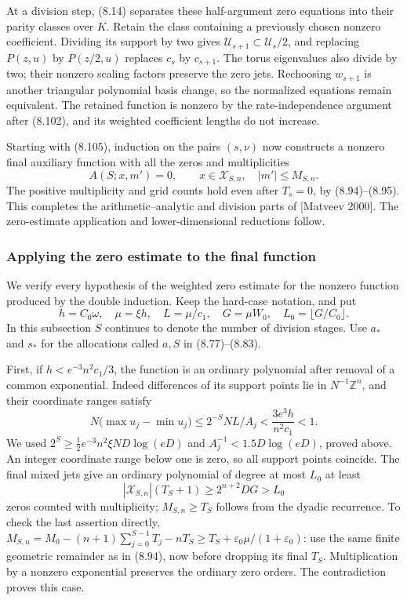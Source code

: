 \documentclass[
  11pt,
  a4paper,
]{article}
\begin{document}
At a division step, (8.14) separates these half-argument zero equations
into their parity classes over \(K\). Retain the class containing a
previously chosen nonzero coefficient. Dividing its support by two gives
\(\mathcal U_{s+1}\subset\mathcal U_s/2\), and replacing \(P(z,u)\) by
\(P(z/2,u)\) replaces \(c_s\) by \(c_{s+1}\). The torus eigenvalues also
divide by two; their nonzero scaling factors preserve the zero jets.
Rechoosing \(w_{s+1}\) is another triangular polynomial basis change, so
the normalized equations remain equivalent. The retained function is
nonzero by the rate-independence argument after (8.102), and its
weighted coefficient lengths do not increase.

Starting with (8.105), induction on the pairs \((s,\nu)\) now constructs
a nonzero final auxiliary function with all the zeros and multiplicities
\[
A(S;x,m')=0,\qquad
x\in\mathcal X_{S,n},\quad |m'|\le M_{S,n}.
\] The positive multiplicity and grid counts hold even after \(T_s=0\),
by (8.94)--(8.95). This completes the arithmetic--analytic and division
parts of {[}Matveev 2000{]}. The zero-estimate application and
lower-dimensional reductions follow.

\subsubsection{Applying the zero estimate to the final
function}\label{applying-the-zero-estimate-to-the-final-function}

We verify every hypothesis of the weighted zero estimate for the nonzero
function produced by the double induction. Keep the hard-case notation,
and put \[
h=C_0\omega,\quad \mu=\xi h,\quad L=\mu/c_1,\quad
G=\mu W_0,\quad L_0=\lfloor G/C_0\rfloor.
\] In this subsection \(S\) continues to denote the number of division
stages. Use \(a_*\) and \(s_*\) for the allocations called \(a,S\) in
(8.77)--(8.83).

First, if \(h<e^{-3}n^2c_1/3\), the function is an ordinary polynomial
after removal of a common exponential. Indeed differences of its support
points lie in \(N^{-1}\mathbb Z^n\), and their coordinate ranges satisfy
\[
N\bigl(\max u_j-\min u_j\bigr)
\le2^{-S}NL/A_j
<\frac{3e^3h}{n^2c_1}<1.
\] We used \(2^S\ge\tfrac12e^{-3}n^2\xi ND\log(eD)\) and
\(A_j^{-1}<1.5D\log(eD)\), proved above. An integer coordinate range
below one is zero, so all support points coincide. The final mixed jets
give an ordinary polynomial of degree at most \(L_0\) at least \[
|\mathcal X_{S,n}|(T_S+1)\ge2^{n+2}DG>L_0
\] zeros counted with multiplicity; \(M_{S,n}\ge T_S\) follows from the
dyadic recurrence. To check the last assertion directly,
\(M_{S,n}=M_0-(n+1)\sum_{j=0}^{S-1}T_j-nT_S
\ge T_S+\varepsilon_0\mu/(1+\varepsilon_0)\): use the same finite
geometric remainder as in (8.94), now before dropping its final \(T_S\).
Multiplication by a nonzero exponential preserves the ordinary zero
orders. The contradiction proves this case.
\end{document}
